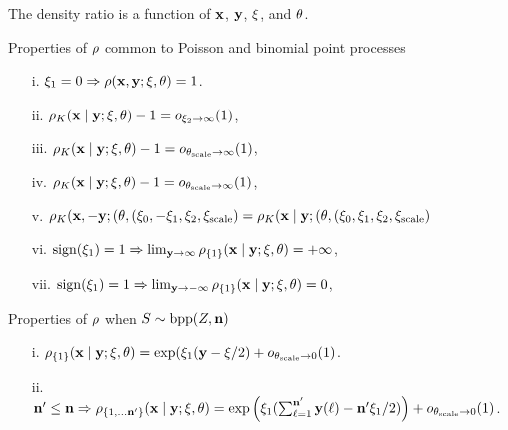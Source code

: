 The density ratio is a function of $\mathbf{x}$, $\mathbf{y}$,  $\xi$, and $\theta$.
\begin{properties}{Properties of $\rho$ common to Poisson and binomial point processes}
\begin{enumerate}
\item[i.] $\xi_1=0\Rightarrow \rho(\mathbf{x},\mathbf{y};\xi,\theta)=1$.
\item[ii.] $\rho_K(\mathbf{x}\mid\mathbf{y};\xi,\theta)-1=o_{\xi_2\to\infty}(1)$,
\item[iii.] $\rho_K(\mathbf{x}\mid\mathbf{y};\xi,\theta)-1=o_{\theta_{\text{scale}}\to\infty}(1)$,
\item[iv.] $\rho_K(\mathbf{x}\mid\mathbf{y};\xi,\theta)-1=o_{\theta_{\text{scale}}\to\infty}(1)$,
\item[v.] $\rho_K(\mathbf{x},-\mathbf{y};(\theta,(\xi_0,-\xi_1,\xi_2,\xi_{\text{scale}})=\rho_K(\mathbf{x}\mid\mathbf{y};(\theta,(\xi_0,\xi_1,\xi_2,\xi_{\text{scale}})$
\item[vi.] $\mathrm{sign}(\xi_1)=1\Rightarrow \lim_{\mathbf{y}\to\infty}\rho_{\{1\}}(\mathbf{x}\mid\mathbf{y};\xi,\theta)=+\infty$,
\item[vii.] $\mathrm{sign}(\xi_1)=1\Rightarrow \lim_{\mathbf{y}\to-\infty}\rho_{\{1\}}(\mathbf{x}\mid\mathbf{y};\xi,\theta)=0$,
\end{enumerate}
\end{properties}




\begin{properties}{Properties of $\rho$ when $S\sim\mathrm{bpp}(Z,\mathbf{n})$}
\begin{enumerate}
\item[i.] $ \rho_{\{1\}}(\mathbf{x}\mid\mathbf{y};\xi,\theta)=
\exp(\xi_1(\mathbf{y}-\xi/2) + o_{\theta_{\text{scale}}\to 0}(1)$.
\item[ii.] $\mathbf{n}'\leq\mathbf{n}\Rightarrow\rho_{\{1,\ldots\mathbf{n}'\}}(\mathbf{x}\mid\mathbf{y};\xi,\theta)=
\exp\left(\xi_1(\sum_{\ell=1}^{\mathbf{n}'}\mathbf{y}(\ell)-\mathbf{n}'\xi_1/2)\right) + o_{\theta_{\text{scale}}\to 0}(1)$.
\end{enumerate}
\end{properties}

